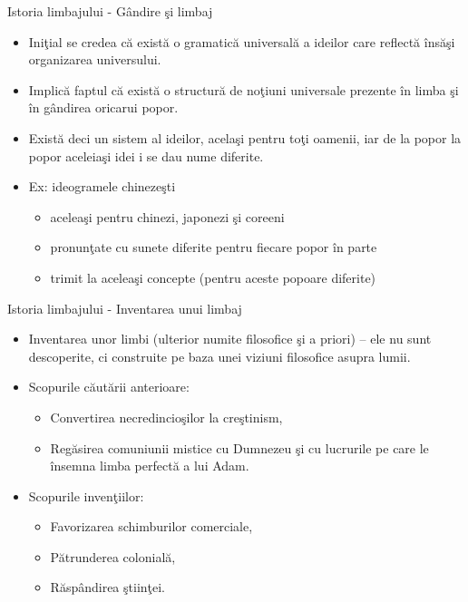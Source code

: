\documentclass[pdf]{beamer}
\begin{document}
\begin{frame}{Istoria limbajului - Gândire şi limbaj}
\begin{itemize}
\item
Iniţial se credea că există o gramatică universală a ideilor care reflectă însăşi organizarea universului.
\item
Implică faptul că există o structură de noţiuni universale prezente în limba şi în gândirea oricarui popor.
\item
Există deci un sistem al ideilor, acelaşi pentru toţi oamenii, iar de la popor la popor aceleiaşi idei i se dau nume diferite.
\item
Ex: ideogramele chinezeşti
\begin{itemize}
\item
aceleaşi pentru chinezi, japonezi şi coreeni
\item
pronunţate cu sunete diferite pentru fiecare popor în parte
\item
trimit la aceleaşi concepte (pentru aceste popoare diferite)
\end{itemize}
\end{itemize}
\end{frame}



\begin{frame}{Istoria limbajului - Inventarea unui limbaj}
\begin{itemize}
\item
Inventarea unor limbi (ulterior numite filosofice şi a priori) – ele nu sunt descoperite, ci construite pe baza unei viziuni filosofice asupra lumii.\\
\item
Scopurile căutării anterioare:
\begin{itemize}
\item
Convertirea necredincioşilor la creştinism,\\
\item
Regăsirea comuniunii mistice cu Dumnezeu şi cu lucrurile pe care le însemna limba perfectă a lui Adam.
\end{itemize}
\item
Scopurile invenţiilor:
\begin{itemize}
\item
Favorizarea schimburilor comerciale,
\item
Pătrunderea colonială,
\item
Răspândirea ştiinţei.
\end{itemize}
\end{itemize}
\end{frame}
\end{document}
